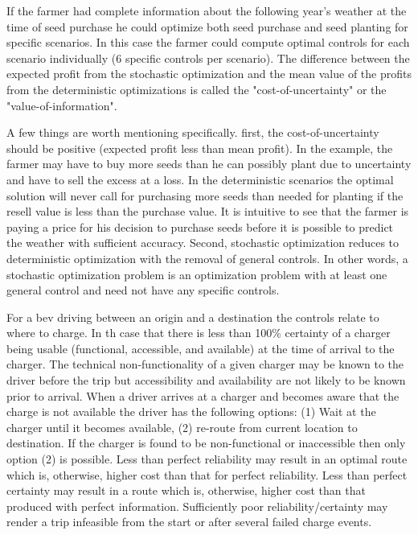 \documentclass[12pt]{article}
\begin{document}
If the farmer had complete information about the following year's weather at the time of seed purchase he could optimize both seed purchase and seed planting for specific scenarios. In this case the farmer could compute optimal controls for each scenario individually (6 specific controls per scenario). The difference between the expected profit from the stochastic optimization and the mean value of the profits from the deterministic optimizations is called the "cost-of-uncertainty" or the "value-of-information".

A few things are worth mentioning specifically. first, the cost-of-uncertainty should be positive (expected profit less than mean profit). In the example, the farmer may have to buy more seeds than he can possibly plant due to uncertainty and have to sell the excess at a loss. In the deterministic scenarios the optimal solution will never call for purchasing more seeds than needed for planting if the resell value is less than the purchase value. It is intuitive to see that the farmer is paying a price for his decision to purchase seeds before it is possible to predict the weather with sufficient accuracy. Second, stochastic optimization reduces to deterministic optimization with the removal of general controls. In other words, a stochastic optimization problem is an optimization problem with at least one general control and need not have any specific controls.

For a \gls{bev} driving between an origin and a destination the controls relate to where to charge. In th case that there is less than 100\% certainty of a charger being usable (functional, accessible, and available) at the time of arrival to the charger. The technical non-functionality of a given charger may be known to the driver before the trip but accessibility and availability are not likely to be known prior to arrival. When a driver arrives at a charger and becomes aware that the charge is not available the driver has the following options: (1) Wait at the charger until it becomes available, (2) re-route from current location to destination. If the charger is found to be non-functional or inaccessible then only option (2) is possible. Less than perfect reliability may result in an optimal route which is, otherwise, higher cost than that for perfect reliability. Less than perfect certainty may result in a route which is, otherwise, higher cost than that produced with perfect information. Sufficiently poor reliability/certainty may render a trip infeasible from the start or after several failed charge events.
\end{document}
